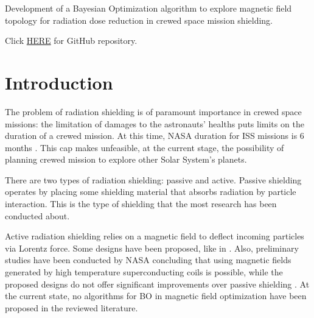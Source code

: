 \documentclass{article}
\begin{document}
	
	\begin{center}
		\Large Development of a Bayesian Optimization algorithm to explore magnetic field topology for radiation dose reduction in crewed space mission shielding.
	\end{center}
	
	\begin{center}
		Click \href{https://github.com/s348174/Magnetic_Active_Radiation_Shielding/tree/main/bayesian_optimization}{HERE} for GitHub repository.
	\end{center}
	
	
	\section*{Introduction}
	The problem of radiation shielding is of paramount importance in crewed space missions: the limitation of damages to the astronauts' healths puts limits on the duration of a crewed mission. At this time, NASA duration for ISS missions is 6 months \cite{Kahn2014}. This cap makes unfeasible, at the current stage, the possibility of planning crewed mission to explore other Solar System's planets. 
	
	There are two types of radiation shielding: passive and active. Passive shielding operates by placing some shielding material that absorbs radiation by particle interaction. This is the type of shielding that the most research has been conducted about.
	
	Active radiation shielding relies on a magnetic field to deflect incoming particles via Lorentz force. Some designs have been proposed, like in \cite{Vuolo2016,undergrad2018,Washburn2015}. Also, preliminary studies have been conducted by NASA concluding that using magnetic fields generated by high temperature superconducting coils is possible, while the proposed designs do not offer significant improvements over passive shielding \cite{niac2014nasa}. At the current state, no algorithms for BO in magnetic field optimization have been proposed in the reviewed literature.
	\\
	
\end{document}
